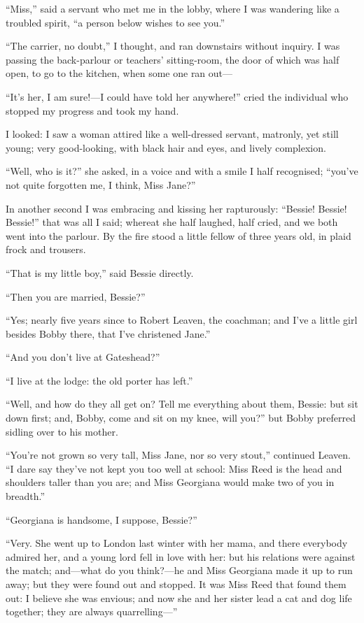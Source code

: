\enquote{Miss,} said a servant who met me in the lobby, where I was
wandering like a troubled spirit, \enquote{a person below wishes to see
you.}

\enquote{The carrier, no doubt,} I thought, and ran downstairs without
inquiry. I was passing the back-parlour or teachers' sitting-room, the
door of which was half open, to go to the kitchen, when some one ran
out---

\enquote{It's her, I am sure!---I could have told her anywhere!} cried
the individual who stopped my progress and took my hand.

I looked: I saw a woman attired like a well-dressed servant, matronly,
yet still young; very good-looking, with black hair and eyes, and lively
complexion.

\enquote{Well, who is it?} she asked, in a voice and with a smile I half
recognised; \enquote{you've not quite forgotten me, I think, Miss Jane?}

In another second I was embracing and kissing her rapturously:
\enquote{Bessie! Bessie! Bessie!} that was all I said; whereat she
half laughed, half cried, and we both went into the parlour. By the
fire stood a little fellow of three years old, in plaid frock and
trousers.

\enquote{That is my little boy,} said Bessie directly.

\enquote{Then you are married, Bessie?}

\enquote{Yes; nearly five years since to Robert Leaven, the coachman;
and I've a little girl besides Bobby there, that I've christened Jane.}

\enquote{And you don't live at Gateshead?}

\enquote{I live at the lodge: the old porter has left.}

\enquote{Well, and how do they all get on? Tell me everything about
them, Bessie: but sit down first; and, Bobby, come and sit on my knee,
will you?} but Bobby preferred sidling over to his mother.

\enquote{You're not grown so very tall, Miss Jane, nor so very stout,}
continued \Mrs{} Leaven. \enquote{I dare say they've not kept you too
well at school: Miss Reed is the head and shoulders taller than you are;
and Miss Georgiana would make two of you in breadth.}

\enquote{Georgiana is handsome, I suppose, Bessie?}

\enquote{Very. She went up to London last winter with her mama, and
there everybody admired her, and a young lord fell in love with her: but
his relations were against the match; and---what do you think?---he and
Miss Georgiana made it up to run away; but they were found out and
stopped. It was Miss Reed that found them out: I believe she was
envious; and now she and her sister lead a cat and dog life together;
they are always quarrelling---}

